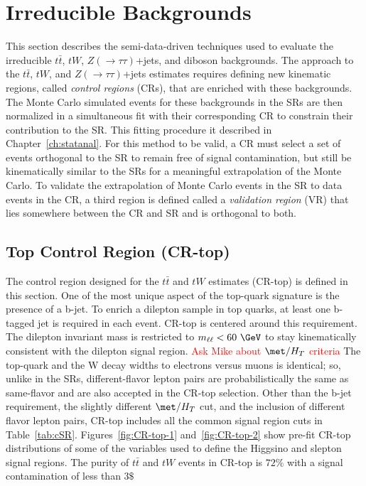 \section{Irreducible Backgrounds}
\label{sec:bkg:irreduce}
This section describes the semi-data-driven techniques used to evaluate the irreducible $t\bar{t}$, $tW$, $Z(\rightarrow\tau\tau)$+jets, and diboson backgrounds.  The approach to the $t\bar{t}$, $tW$, and $Z(\rightarrow\tau\tau)$+jets estimates requires defining new kinematic regions, called \textit{control regions} (CRs), that are enriched with these backgrounds.  The Monte Carlo simulated events for these backgrounds in the SRs are then normalized in a simultaneous fit with their corresponding CR to constrain their contribution to the SR.  This fitting procedure it described in Chapter~\ref{ch:statanal}.  For this method to be valid, a CR must select a set of events orthogonal to the SR to remain free of signal contamination, but still be kinematically similar to the SRs for a meaningful extrapolation of the Monte Carlo.  To validate the extrapolation of Monte Carlo events in the SR to data events in the CR, a third region is defined called a \textit{validation region} (VR) that lies somewhere between the CR and SR and is orthogonal to both.

\subsection{Top Control Region (CR-top)}
The control region designed for the $t\bar{t}$ and $tW$ estimates (CR-top) is defined in this section.  One of the most unique aspect of the top-quark signature is the presence of a b-jet.  To enrich a dilepton sample in top quarks, at least one b-tagged jet is required in each event.  CR-top is centered around this requirement.  The dilepton invariant mass is restricted to $m_{\ell\ell}<60~\GeV$ to stay kinematically consistent with the dilepton signal region.  \textcolor{red}{Ask Mike about $\met/H_T$ criteria}  The top-quark and the W decay widths to electrons versus muons is identical; so, unlike in the SRs, different-flavor lepton pairs are probabilistically the same as same-flavor and are also accepted in the CR-top selection.  Other than the b-jet requirement, the slightly different $\met/H_T$ cut, and the inclusion of different flavor lepton pairs, CR-top includes all the common signal region cuts in Table~\ref{tab:cSR}. Figures~\ref{fig:CR-top-1} and~\ref{fig:CR-top-2} show pre-fit CR-top distributions of some of the variables used to define the Higgsino and slepton signal regions.  The purity of $t\bar{t}$ and $tW$ events in CR-top is $72\%$ with a signal contamination of less than $3\$$

